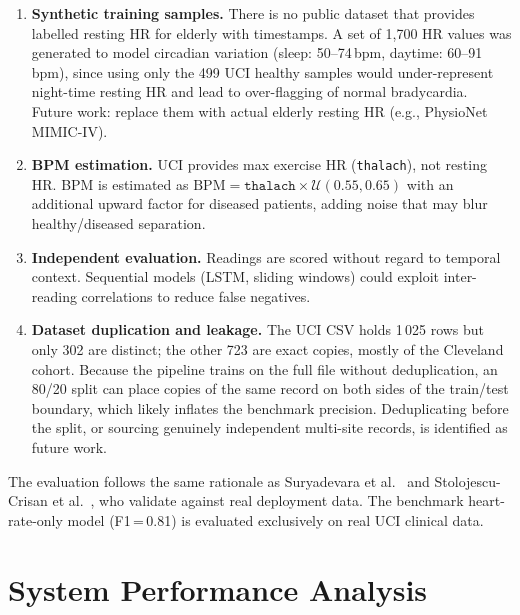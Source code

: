 \begin{enumerate}

\item \textbf{Synthetic training samples.} There is no public dataset that provides labelled resting HR for elderly with timestamps. A set of 1,700 HR values was generated to model circadian variation (sleep: 50--74\,bpm, daytime: 60--91\,bpm), since using only the 499 UCI healthy samples would under-represent night-time resting HR and lead to over-flagging of normal bradycardia. 
Future work: replace them with actual elderly resting HR (e.g., PhysioNet MIMIC-IV).

\item \textbf{BPM estimation.} UCI provides max exercise HR (\texttt{thalach}), not resting HR. BPM is estimated as $\text{BPM} = \texttt{thalach} \times \mathcal{U}(0.55, 0.65)$ with an additional upward factor for diseased patients, adding noise that may blur healthy/diseased separation.

\item \textbf{Independent evaluation.} Readings are scored without regard to temporal context. Sequential models (LSTM, sliding windows) could exploit inter-reading correlations to reduce false negatives.

\item \textbf{Dataset duplication and leakage.} The UCI CSV holds 1\,025 rows but only 302 are distinct; the other 723 are exact copies, mostly of the Cleveland cohort. Because the pipeline trains on the full file without deduplication, an 80/20 split can place copies of the same record on both sides of the train/test boundary, which likely inflates the benchmark precision. Deduplicating before the split, or sourcing genuinely independent multi-site records, is identified as future work.

\end{enumerate}

The evaluation follows the same rationale as Suryadevara et al.~\cite{Suryadevara2012}
and Stolojescu-Crisan et al.~\cite{Stolojescu2021}, who validate against real
deployment data. The benchmark heart-rate-only model (F1\,=\,0.81) is evaluated
exclusively on real UCI clinical data.

\section{System Performance Analysis}
\label{sec:performance}

